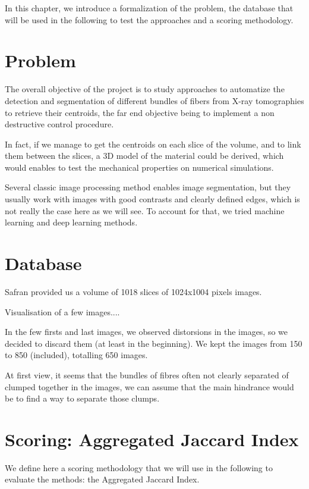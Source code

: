 \documentclass{report}
\begin{document}
In this chapter, we introduce a formalization of the problem, the database that will be used in the following to test the approaches and a scoring methodology.

\section{Problem}

The overall objective of the project is to study approaches to automatize the detection and segmentation of different bundles of fibers from X-ray tomographies to retrieve their centroids, the far end objective being to implement a non destructive control procedure.  

In fact, if we manage to get the centroids on each slice of the volume, and to link them between the slices, a 3D model of the material could be derived, which would enables to test the mechanical properties on numerical simulations.

Several classic image processing method enables image segmentation, but they usually work with images with good contrasts and clearly defined edges, which is not really the case here as we will see. To account for that, we tried machine learning and deep learning methods.

\section{Database}

Safran provided us a volume of 1018 slices of 1024x1004 pixels images. \newline

Visualisation of a few images....

In the few firsts and last images, we observed distorsions in the images, so we decided to discard them (at least in the beginning). We kept the images from 150 to 850 (included), totalling 650 images.  

At first view, it seems that the bundles of fibres often not clearly separated of clumped together in the images, we can assume that the main hindrance would be to find a way to separate those clumps.

\section{Scoring: Aggregated Jaccard Index}

We define here a scoring methodology that we will use in the following to evaluate the methods: the Aggregated Jaccard Index. \newline
\end{document}
